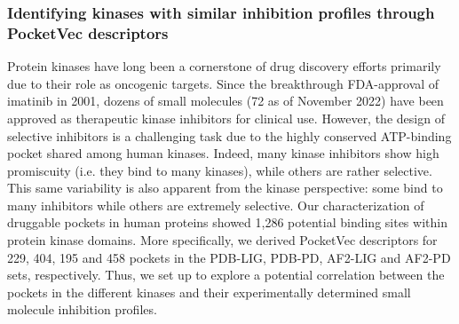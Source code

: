 
\subsubsection{Identifying kinases with similar inhibition profiles through PocketVec descriptors}
\label{PocketVec_ResultsAndDiscussion_Identifying_Kinases}

Protein kinases have long been a cornerstone of drug discovery efforts primarily due to their role as oncogenic targets\cite{attwood_trends_2021}. Since the breakthrough FDA-approval of imatinib in 2001, dozens of small molecules (72 as of November 2022\cite{roskoski_properties_2023}) have been approved as therapeutic kinase inhibitors for clinical use. However, the design of selective inhibitors is a challenging task due to the highly conserved ATP-binding pocket shared among human kinases. Indeed, many kinase inhibitors show high promiscuity (i.e. they bind to many kinases), while others are rather selective\cite{karaman_quantitative_2008, davis_comprehensive_2011}. This same variability is also apparent from the kinase perspective: some bind to many inhibitors while others are extremely selective\cite{hanson_what_2019}. Our characterization of druggable pockets in human proteins showed 1,286 potential binding sites within protein kinase domains. More specifically, we derived PocketVec descriptors for 229, 404, 195 and 458 pockets in the PDB-LIG, PDB-PD, AF2-LIG and AF2-PD sets, respectively. Thus, we set up to explore a potential correlation between the pockets in the different kinases and their experimentally determined small molecule inhibition profiles.

